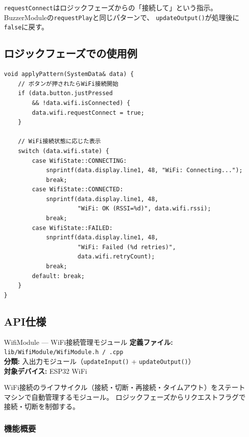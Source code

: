 \begin{pointbox}[リクエストフラグパターン]
\texttt{requestConnect}はロジックフェーズからの「接続して」という指示。
BuzzerModuleの\texttt{requestPlay}と同じパターンで、
\texttt{updateOutput()}が処理後に\texttt{false}に戻す。
\end{pointbox}

\subsection{ロジックフェーズでの使用例}

\begin{lstlisting}[style=cppstyle, caption={ロジックフェーズでのWiFi制御}]
void applyPattern(SystemData& data) {
    // ボタンが押されたらWiFi接続開始
    if (data.button.justPressed
        && !data.wifi.isConnected) {
        data.wifi.requestConnect = true;
    }

    // WiFi接続状態に応じた表示
    switch (data.wifi.state) {
        case WifiState::CONNECTING:
            snprintf(data.display.line1, 48, "WiFi: Connecting...");
            break;
        case WifiState::CONNECTED:
            snprintf(data.display.line1, 48,
                     "WiFi: OK (RSSI=%d)", data.wifi.rssi);
            break;
        case WifiState::FAILED:
            snprintf(data.display.line1, 48,
                     "WiFi: Failed (%d retries)",
                     data.wifi.retryCount);
            break;
        default: break;
    }
}
\end{lstlisting}

\subsection{API仕様}


\begin{apibox}{WifiModule --- WiFi接続管理モジュール}
\textbf{定義ファイル:} \texttt{lib/WifiModule/WifiModule.h / .cpp}\\
\textbf{分類:} 入出力モジュール（\texttt{updateInput()} + \texttt{updateOutput()}）\\
\textbf{対象デバイス:} ESP32 WiFi

WiFi接続のライフサイクル（接続・切断・再接続・タイムアウト）をステートマシンで自動管理するモジュール。
ロジックフェーズからリクエストフラグで接続・切断を制御する。
\end{apibox}

\subsubsection{機能概要}

